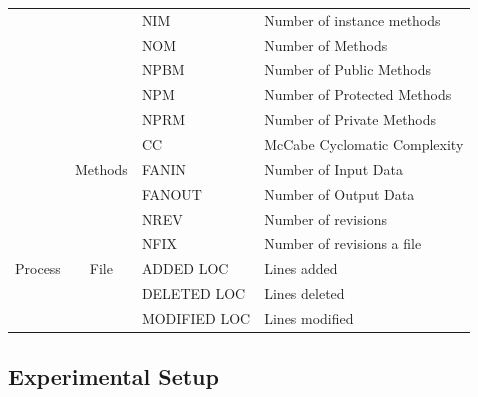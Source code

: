 \documentclass[10pt,journal,compsoc]{IEEEtran}
\begin{document}
{\begin{table}[]
\begin{tabular}{|p{1cm}|c|l|p{3cm}|}
                                  &                                   & NIM         & Number of instance methods     \\ \cline{3-4} 
                                  &                                   & NOM         & Number of Methods              \\ \cline{3-4} 
                                  &                                   & NPBM        & Number of Public Methods       \\ \cline{3-4} 
                                  &                                   & NPM         & Number of Protected Methods    \\ \cline{3-4} 
                                  &                                   & NPRM        & Number of Private Methods      \\ \cline{2-4} 
                                  & \multirow{3}{*}{Methods}          & CC          & McCabe Cyclomatic Complexity   \\ \cline{3-4} 
                                  &                                   & FANIN       & Number of Input Data           \\ \cline{3-4} 
                                  &                                   & FANOUT      & Number of Output Data          \\ \hline
\multirow{5}{*}{Process }  & \multirow{5}{*}{File}             & NREV        & Number of revisions            \\ \cline{3-4} 
                                  &                                   & NFIX        & Number of revisions a file     \\ \cline{3-4} 
                                  &                                   & ADDED LOC    & Lines added                    \\ \cline{3-4} 
                                  &                                   & DELETED LOC  & Lines deleted                  \\ \cline{3-4} 
                                  &                                   & MODIFIED LOC & Lines modified                 \\ \hline
\end{tabular}
\end{table}
}


\subsection{Experimental Setup}
\label{sec:Experimental}
\end{document}
